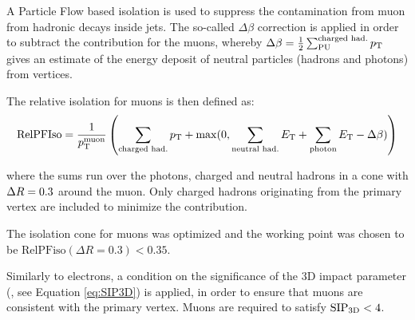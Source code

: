 A Particle Flow based isolation is used to suppress the contamination from muon from hadronic decays inside jets.
The so-called $\Delta\beta$ correction is applied in order to subtract the \pileup{} contribution for the muons, 
whereby $\Delta\beta = \frac{1}{2} \sum^\text{charged had.}_\text{PU} p_{\mathrm{T}}$
gives an estimate of the energy deposit of neutral particles (hadrons and photons) from \pileup{} vertices.

The relative isolation for muons is then defined as:
\begin{equation}
\text{RelPFIso} = \frac{1}{p_{\mathrm{T}}^\text{muon}} \left( \sum_\text{charged had.} p_{\mathrm{T}} + \max(0, \sum_\text{neutral had.} E_{\mathrm{T}} + \sum_\text{photon} E_{\mathrm{T}} - \Delta \beta) \right)
\label{eqn:mupfiso}
\end{equation}

where the sums run over the photons, charged and neutral hadrons in a cone with $\Delta R = 0.3$ around the muon.
Only charged hadrons originating from the primary vertex are included to minimize the \pileup{} contribution.

The isolation cone for muons was optimized and the working point was chosen to be $\text{RelPFiso}(\Delta R = 0.3) < 0.35$.

Similarly to electrons, a condition on the significance of the 3D impact parameter (\SIPthreeD, see Equation \ref{eq:SIP3D}) is applied,
in order to ensure that muons are consistent with the primary vertex.
Muons are required to satisfy $\mathrm{SIP}_{\mathrm{3D}} < 4$.
